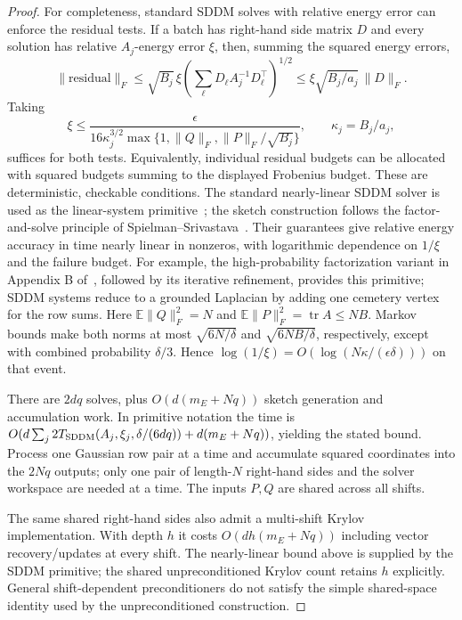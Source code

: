 \documentclass[11pt]{article}
\DeclareMathOperator{\tr}{tr}
\newcommand{\E}{\mathbb E}
\begin{document}
\begin{proof}
For completeness, standard SDDM solves with relative energy error
can enforce the residual tests. If a batch has right-hand side
matrix $D$ and every solution has relative $A_j$-energy error $\xi$,
then, summing the squared energy errors,
\[
 \|\text{residual}\|_F
 \leq\sqrt{B_j}\,\xi
      \left(\sum_\ell D_\ell A_j^{-1}D_\ell^\top\right)^{1/2}
 \leq\xi\sqrt{B_j/a_j}\,\|D\|_F.
\]
Taking
\[
 \xi\leq\frac{\epsilon}{16\kappa_j^{3/2}
              \max\{1,\|Q\|_F,\|P\|_F/\sqrt{B_j}\}},
 \qquad\kappa_j=B_j/a_j,
\]
suffices for both tests. Equivalently, individual residual budgets
can be allocated with squared budgets summing to the displayed
Frobenius budget. These are deterministic, checkable conditions.
The standard nearly-linear SDDM solver is used as the linear-system
primitive~\cite{kyng2016}; the sketch construction follows the
factor-and-solve principle of Spielman--Srivastava~\cite{ss2011}.
Their guarantees give relative energy accuracy in time nearly linear
in nonzeros, with logarithmic dependence on $1/\xi$ and the failure
budget. For example, the high-probability factorization variant in
Appendix B of~\cite{kyng2016}, followed by its iterative refinement,
provides this primitive; SDDM systems reduce to a grounded Laplacian
by adding one cemetery vertex for the row sums. Here $\E\|Q\|_F^2=N$ and
$\E\|P\|_F^2=\tr A\leq NB$. Markov bounds make both norms at most
$\sqrt{6N/\delta}$ and $\sqrt{6NB/\delta}$, respectively, except
with combined probability $\delta/3$. Hence
$\log(1/\xi)=O(\log(N\kappa/(\epsilon\delta)))$ on that event.

There are $2dq$ solves, plus $O(d(m_E+Nq))$ sketch generation and
accumulation work. In primitive notation the time is
$O(d\sum_j 2T_{\rm SDDM}(A_j,\xi_j,\delta/(6dq))
   +d(m_E+Nq))$, yielding the stated bound.
Process one Gaussian row pair at a time and accumulate squared
coordinates into the $2Nq$ outputs; only one pair of length-$N$
right-hand sides and the solver workspace are needed at a time.
The inputs $P,Q$ are shared across all shifts.

The same shared right-hand sides also admit a multi-shift Krylov
implementation. With depth $h$ it costs
$O(dh(m_E+Nq))$ including vector recovery/updates at every shift.
The nearly-linear bound above is supplied by the SDDM primitive;
the shared unpreconditioned Krylov count retains $h$ explicitly.
General shift-dependent preconditioners do not satisfy the simple
shared-space identity used by the unpreconditioned construction.


\end{proof}
\end{document}
